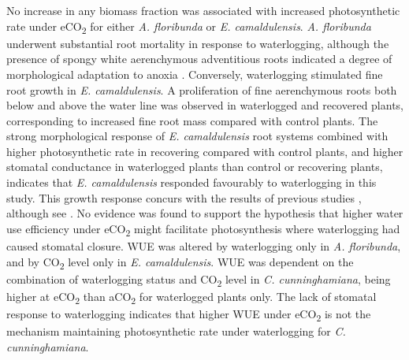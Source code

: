 \documentclass[12pt,a4paper]{memoir}
\begin{document}
No increase in any biomass fraction was associated with increased photosynthetic rate under eCO\textsubscript{2} for either \textit{A. floribunda} or \textit{E. camaldulensis}. \textit{A. floribunda} underwent substantial root mortality in response to waterlogging, although the presence of spongy white aerenchymous adventitious roots indicated a degree of morphological adaptation to anoxia \citep{Evans2004}. Conversely, waterlogging stimulated fine root growth in \textit{E. camaldulensis}. A proliferation of fine aerenchymous roots both below and above the water line was observed in waterlogged and recovered plants, corresponding to increased fine root mass compared with control plants. The strong morphological response of \textit{E. camaldulensis} root systems combined with higher photosynthetic rate in recovering compared with control plants, and higher stomatal conductance in waterlogged plants than control or recovering plants, indicates that \textit{E. camaldulensis} responded favourably to waterlogging in this study. This growth response concurs with the results of previous studies \citep{Sena-Gomes1980, Marcar1993}, although see \citep{Kogawara2006}. No evidence was found to support the hypothesis that higher water use efficiency under eCO\textsubscript{2} might facilitate photosynthesis where waterlogging had caused stomatal closure. WUE was altered by waterlogging only in \textit{A. floribunda}, and by CO\textsubscript{2} level only in \textit{E. camaldulensis}. WUE was dependent on the combination of waterlogging status and CO\textsubscript{2} level in \textit{C. cunninghamiana}, being higher at eCO\textsubscript{2} than aCO\textsubscript{2} for waterlogged plants only. The lack of stomatal response to waterlogging indicates that higher WUE under eCO\textsubscript{2} is not the mechanism maintaining photosynthetic rate under waterlogging for \textit{C. cunninghamiana}. 
\end{document}
